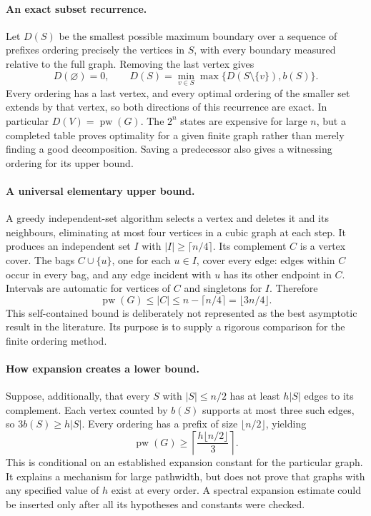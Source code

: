 \documentclass[11pt,a4paper]{article}
\begin{document}
\paragraph{An exact subset recurrence.}
Let $D(S)$ be the smallest possible maximum boundary over a sequence
of prefixes ordering precisely the vertices in $S$, with every boundary
measured relative to the full graph. Removing the last vertex gives
\[
 D(\varnothing)=0,\qquad
 D(S)=\min_{v\in S}\max\{D(S\setminus\{v\}),b(S)\}.
\]
Every ordering has a last vertex, and every optimal ordering of the
smaller set extends by that vertex, so both directions of this
recurrence are exact. In particular $D(V)=\operatorname{pw}(G)$.
The $2^n$ states are expensive for large $n$, but a completed table
proves optimality for a given finite graph rather than merely finding
a good decomposition. Saving a predecessor also gives a witnessing
ordering for its upper bound.

\paragraph{A universal elementary upper bound.}
A greedy independent-set algorithm selects a vertex and deletes it
and its neighbours, eliminating at most four vertices in a cubic
graph at each step. It produces an independent set $I$ with
$|I|\ge\lceil n/4\rceil$. Its complement $C$ is a vertex cover.
The bags $C\cup\{u\}$, one for each $u\in I$, cover every edge:
edges within $C$ occur in every bag, and any edge incident with $u$
has its other endpoint in $C$. Intervals are automatic for vertices
of $C$ and singletons for $I$. Therefore
\[
                   \operatorname{pw}(G)\le |C|
                   \le n-\lceil n/4\rceil=\lfloor3n/4\rfloor.
\]
This self-contained bound is deliberately not represented as the
best asymptotic result in the literature. Its purpose is to supply a
rigorous comparison for the finite ordering method.

\paragraph{How expansion creates a lower bound.}
Suppose, additionally, that every $S$ with $|S|\le n/2$ has at least
$h|S|$ edges to its complement. Each vertex counted by $b(S)$
supports at most three such edges, so $3b(S)\ge h|S|$.
Every ordering has a prefix of size $\lfloor n/2\rfloor$, yielding
\[
             \operatorname{pw}(G)\ge
             \left\lceil\frac{h\lfloor n/2\rfloor}{3}\right\rceil.
\]
This is conditional on an established expansion constant for the
particular graph. It explains a mechanism for large pathwidth, but
does not prove that graphs with any specified value of $h$ exist at
every order. A spectral expansion estimate could be inserted only
after all its hypotheses and constants were checked.
\end{document}
